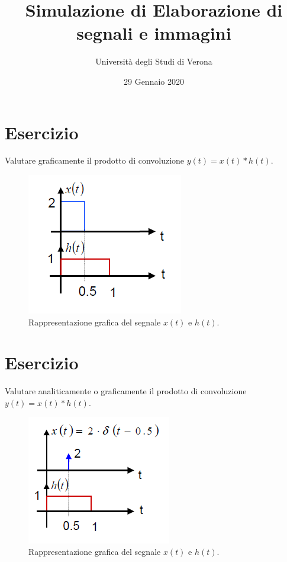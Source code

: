 \documentclass[a4paper]{article}
\begin{document}
	\author{Università degli Studi di Verona}
	\title{Simulazione di Elaborazione di segnali e immagini}
	\date{{\Large 29 Gennaio 2020}}
	\maketitle
	
	\section{Esercizio}
	
	Valutare graficamente il prodotto di convoluzione $y\left(t\right) = x\left(t\right) * h\left(t\right)$.
	
	\begin{figure}[!htp]
		\centering
		\includegraphics[width=.4\textwidth]{img/fig_1.png}
		\caption{Rappresentazione grafica del segnale $x\left(t\right)$ e $h\left(t\right)$.}
	\end{figure}
	
	\section{Esercizio}

	Valutare analiticamente o graficamente il prodotto di convoluzione $y\left(t\right) = x\left(t\right) * h\left(t\right)$.
	
	\begin{figure}[!htp]
		\centering
		\includegraphics[width=.4\textwidth]{img/fig_2.png}
		\caption{Rappresentazione grafica del segnale $x\left(t\right)$ e $h\left(t\right)$.}
	\end{figure}
\end{document}
